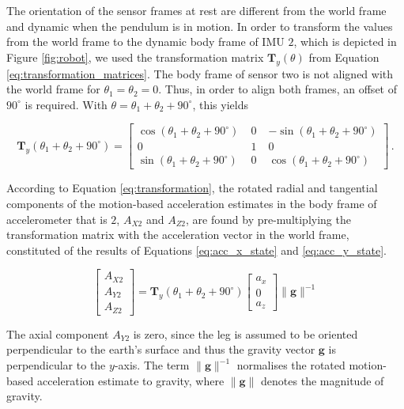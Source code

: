The orientation of the sensor frames at rest are different from the world frame and dynamic when the pendulum is in motion. In order to transform the values from the world frame to the dynamic body frame of \gls{IMU} $2$, which is depicted in Figure \ref{fig:robot}, we used the transformation matrix $\mathbf{T}_y(\theta)$ from Equation \ref{eq:transformation_matrices}. The body frame of sensor two is not aligned with the world frame for $\theta_1 = \theta_2 = 0$. Thus, in order to align both frames, an offset of $90^{\circ}$ is required. With $\theta = \theta_1 + \theta_2 + 90^{\circ}$, this yields

\begin{equation}
\mathbf{T}_y(\theta_1 + \theta_2 + 90^{\circ}) = \left[ \begin{smallmatrix}
    \cos (\theta_1 + \theta_2 + 90^{\circ}) \; & 0 \; & -\sin (\theta_1 + \theta_2 + 90^{\circ}) \\
    0 \; & 1 \; & 0 \\
    \sin (\theta_1 + \theta_2 + 90^{\circ}) \; & 0 \; & \cos (\theta_1 + \theta_2 + 90^{\circ})
    \end{smallmatrix} \right] \,.
\end{equation}

\noindent
According to Equation \ref{eq:transformation}, the rotated radial and tangential components of the motion-based acceleration estimates in the body frame of accelerometer that is $2$, $A_{X2}$ and $A_{Z2}$, are found by pre-multiplying the transformation matrix with the acceleration vector in the world frame, constituted of the results of Equations \ref{eq:acc_x_state} and \ref{eq:acc_y_state}.

\begin{equation}
  \begin{bmatrix}
  	A_{X2} \\
  	A_{Y2} \\
  	A_{Z2}
  \end{bmatrix} = \mathbf{T}_y(\theta_1 + \theta_2 + 90^{\circ}) \begin{bmatrix}
  	a_x \\
  	0 \\
	a_z
  \end{bmatrix} \|\mathbf{g}\|^{-1}
\end{equation}

\noindent
The axial component $A_{Y2}$ is zero, since the leg is assumed to be oriented perpendicular to the earth's surface and thus the gravity vector $\mathbf{g}$ is perpendicular to the $y$-axis. The term $\|\mathbf{g}\|^{-1}$ normalises the rotated motion-based acceleration estimate to gravity, where $\|\mathbf{g}\|$ denotes the magnitude of gravity. 

